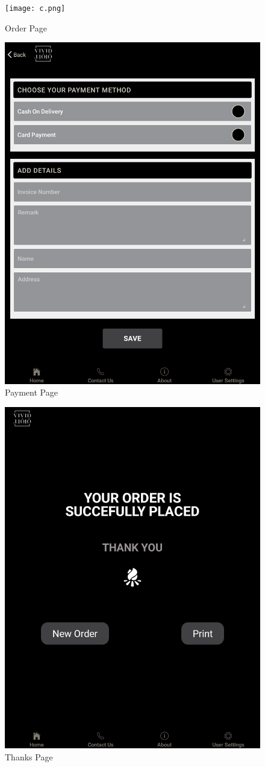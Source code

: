 \documentclass[a4paper,12pt]{article}
\begin{document}
\newpage
\begin{figure}[h!]
\centering\texttt{[image: c.png]}
\caption{Order Page}
\end{figure}
\newpage
\begin{figure}[h!]
\centering
\includegraphics[height=1.1\textwidth]{d.png}
\caption{Payment Page}
\end{figure}
\newpage
\begin{figure}[h!]
\centering
\includegraphics[height=1.1\textwidth]{e.png}
\caption{Thanks Page}
\end{figure}
\end{document}
